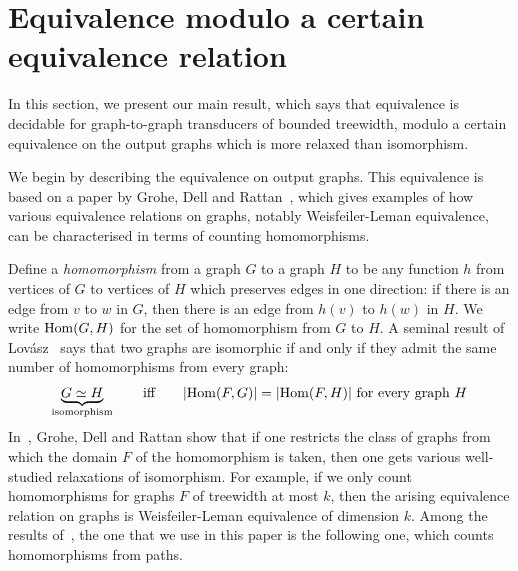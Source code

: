 
\section{Equivalence  modulo a certain equivalence relation}
In this section, we present our main result, which says  that equivalence is decidable for graph-to-graph transducers of bounded treewidth, modulo a certain equivalence on the output graphs which is more relaxed than isomorphism.  

 We begin by describing the equivalence on output graphs.
This equivalence is based on a paper by Grohe, Dell and Rattan~\cite{groheDellRattan2018}, which gives examples of how various equivalence relations on graphs, notably Weisfeiler-Leman equivalence, can be characterised in terms of counting homomorphisms. 

Define a \emph{homomorphism} from a graph $G$ to a graph $H$ to be any function $h$ from vertices of $G$ to vertices of $H$ which preserves edges in one direction: if there is an edge from $v$ to $w$ in $G$, then there is an edge from $h(v)$ to $h(w)$ in $H$. We write $\mathrm {Hom}(G,H)$ for the set of homomorphism from $G$ to $H$. A seminal result of  Lov\'asz~\cite[p.~326]{lovasz1967operations} says that two graphs are isomorphic if and only if they admit the same number of homomorphisms from every graph:
\begin{align*}
\underbrace{G \simeq H}_{\text{isomorphism}} \qquad \text{iff} \qquad  |\mathrm {Hom}(F,G)|=|\mathrm {Hom}(F,H)| \ \text{for every graph $H$}
\end{align*}
In~\cite{groheDellRattan2018},
Grohe, Dell and Rattan show that if one restricts the  class of graphs from which the domain $F$ of the homomorphism is taken, then one gets various well-studied relaxations of isomorphism. For example, if we only count homomorphisms for graphs $F$ of treewidth at most $k$, then the arising equivalence relation on graphs is Weisfeiler-Leman equivalence of dimension $k$.  Among the results of~\cite{groheDellRattan2018}, the one that we use in this paper is the following one, which counts homomorphisms from paths.

